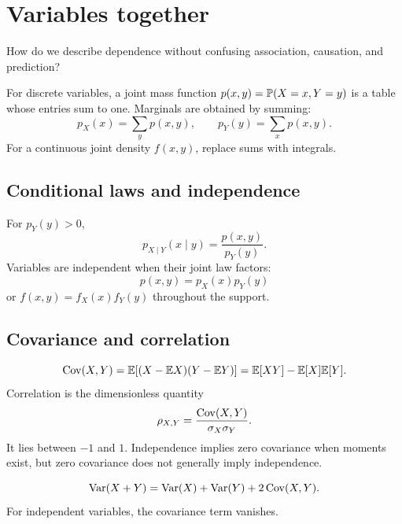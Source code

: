 \chapter{Variables together}

\begin{question}
How do we describe dependence without confusing association, causation, and prediction?
\end{question}

For discrete variables, a joint mass function $p(x,y)=\P(X=x,Y=y)$ is a table whose entries sum to one. Marginals are obtained by summing:
\[
p_X(x)=\sum_y p(x,y),\qquad p_Y(y)=\sum_x p(x,y).
\]
For a continuous joint density $f(x,y)$, replace sums with integrals.

\begin{center}
\end{center}

\section{Conditional laws and independence}

For $p_Y(y)>0$,
\[
p_{X\mid Y}(x\mid y)=\frac{p(x,y)}{p_Y(y)}.
\]
Variables are independent when their joint law factors:
\[
p(x,y)=p_X(x)p_Y(y)
\]
or $f(x,y)=f_X(x)f_Y(y)$ throughout the support.

\section{Covariance and correlation}

\[
\Cov(X,Y)=\E[(X-\E X)(Y-\E Y)]
=\E[XY]-\E[X]\E[Y].
\]
Correlation is the dimensionless quantity
\[
\rho_{X,Y}=\frac{\Cov(X,Y)}{\sigma_X\sigma_Y}.
\]
It lies between $-1$ and $1$. Independence implies zero covariance when moments exist, but zero covariance does not generally imply independence.

\begin{theorem}
\[
\Var(X+Y)=\Var(X)+\Var(Y)+2\Cov(X,Y).
\]
For independent variables, the covariance term vanishes.
\end{theorem}

